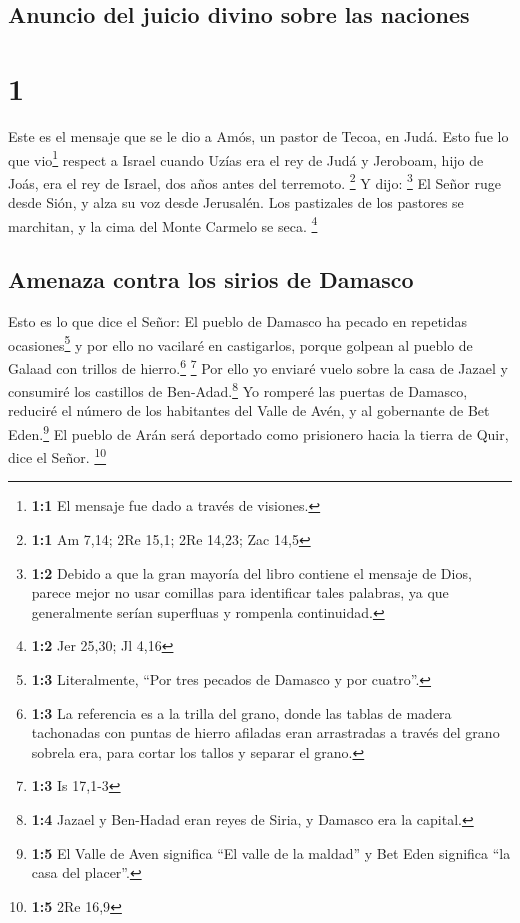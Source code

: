 \hypertarget{anuncio-del-juicio-divino-sobre-las-naciones}{%
\subsection{Anuncio del juicio divino sobre las
naciones}\label{anuncio-del-juicio-divino-sobre-las-naciones}}

\hypertarget{section}{%
\section{1}\label{section}}

 Este es el mensaje que se le dio a Amós, un pastor de
Tecoa, en Judá. Esto fue lo que vio\footnote{\textbf{1:1} El mensaje fue
  dado a través de visiones.} respect a Israel cuando Uzías era el rey
de Judá y Jeroboam, hijo de Joás, era el rey de Israel, dos años antes
del terremoto. \footnote{\textbf{1:1} Am 7,14; 2Re 15,1; 2Re 14,23; Zac
  14,5}  Y dijo: \footnote{\textbf{1:2} Debido a que la
  gran mayoría del libro contiene el mensaje de Dios, parece mejor no
  usar comillas para identificar tales palabras, ya que generalmente
  serían superfluas y rompenla continuidad.} El Señor ruge desde Sión, y
alza su voz desde Jerusalén. Los pastizales de los pastores se
marchitan, y la cima del Monte Carmelo se seca. \footnote{\textbf{1:2}
  Jer 25,30; Jl 4,16}

\hypertarget{amenaza-contra-los-sirios-de-damasco}{%
\subsection{Amenaza contra los sirios de
Damasco}\label{amenaza-contra-los-sirios-de-damasco}}

 Esto es lo que dice el Señor: El pueblo de Damasco ha
pecado en repetidas ocasiones\footnote{\textbf{1:3} Literalmente, ``Por
  tres pecados de Damasco y por cuatro''.} y por ello no vacilaré en
castigarlos, porque golpean al pueblo de Galaad con trillos de
hierro.\footnote{\textbf{1:3} La referencia es a la trilla del grano,
  donde las tablas de madera tachonadas con puntas de hierro afiladas
  eran arrastradas a través del grano sobrela era, para cortar los
  tallos y separar el grano.} \footnote{\textbf{1:3} Is 17,1-3}
 Por ello yo enviaré vuelo sobre la casa de Jazael y
consumiré los castillos de Ben-Adad.\footnote{\textbf{1:4} Jazael y
  Ben-Hadad eran reyes de Siria, y Damasco era la capital.}
 Yo romperé las puertas de Damasco, reduciré el número de
los habitantes del Valle de Avén, y al gobernante de Bet
Eden.\footnote{\textbf{1:5} El Valle de Aven significa ``El valle de la
  maldad'' y Bet Eden significa ``la casa del placer''.} El pueblo de
Arán será deportado como prisionero hacia la tierra de Quir, dice el
Señor. \footnote{\textbf{1:5} 2Re 16,9}

